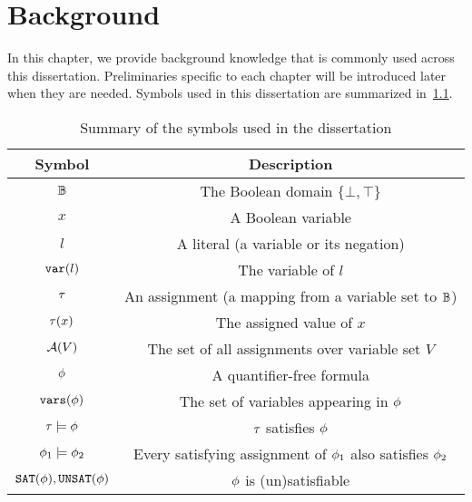 \chapter{Background}
\label{chap:background}

In this chapter, we provide background knowledge that is commonly used across this dissertation.
Preliminaries specific to each chapter will be introduced later when they are needed.
Symbols used in this dissertation are summarized in~\cref{tbl:background-symbols}.

\begin{table}[t]
    \centering
    \caption{Summary of the symbols used in the dissertation}
    \label{tbl:background-symbols}
    \begin{tabular}{c|c}
        Symbol                      & Description                                                   \\
        \hline
        $\mathbb{B}$                  & The Boolean domain $\{\bot,\top\}$                            \\
        $x$                         & A Boolean variable                                            \\
        $l$                         & A literal (a variable or its negation)                        \\
        $\texttt{var}(l)$                    & The variable of $l$                                           \\
        $\tau$                       & An assignment (a mapping from a variable set to $\mathbb{B}$)   \\
        $\tau(x)$                    & The assigned value of $x$                                     \\
        $\mathcal{A}(V)$                    & The set of all assignments over variable set $V$              \\
        $\phi$                       & A quantifier-free formula                                     \\
        $\texttt{vars}(\phi)$                  & The set of variables appearing in $\phi$                       \\
        $\tau\models\phi$             & $\tau$ satisfies $\phi$                                         \\
        $\phi_1\models\phi_2$         & Every satisfying assignment of $\phi_1$ also satisfies $\phi_2$ \\
        $\texttt{SAT}(\phi),\texttt{UNSAT}(\phi)$     & $\phi$ is (un)satisfiable                                      \\

\end{tabular}
\end{table}
